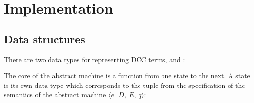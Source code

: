 \section{Implementation}

\subsection{Data structures}
There are two data types for representing DCC terms,  and :

\begin{comment}
data Value = Var Char
  | Abs Char Expr
  | Prompt Int
  
data Expr = Val Value 
  | App Expr Expr
  | Hole
  | PushPrompt Expr Expr
  | PushSubCont Expr Expr
  | WithSubCont Expr Expr
  | NewPrompt
  | Seq [Expr]
  | Sub Expr Expr Char
\end{comment}

\begin{Shaded}
\begin{Highlighting}[]
  \FunctionTok{=}  
  \FunctionTok{|}   
  \FunctionTok{|}  
  
  \FunctionTok{=}   
  \FunctionTok{|}   
  \FunctionTok{|} 
  \FunctionTok{|}   
  \FunctionTok{|}   
  \FunctionTok{|}   
  \FunctionTok{|} 
  \FunctionTok{|}  \NormalTok{[}\NormalTok{]}
  \FunctionTok{|}    
\end{Highlighting}
\end{Shaded}

The core of the abstract machine is a function from one state to the next. A state is its own data type which corresponds to the tuple from the specification of the semantics of the abstract machine $\langle e,\ D,\ E,\ q\rangle$:

\begin{comment}
data State = State Expr Expr [Expr] Value
\end{comment}

